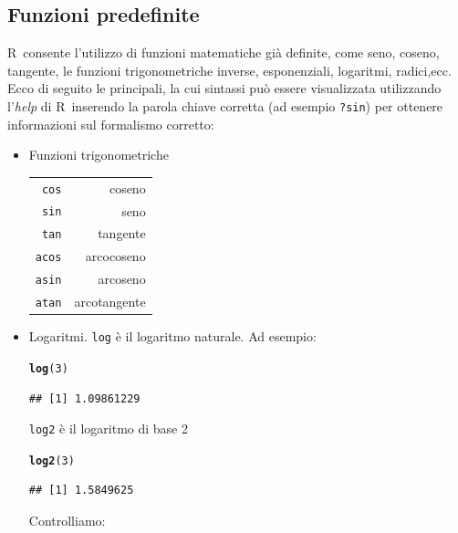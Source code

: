 \documentclass[onecolumn,11pt]{book}\usepackage[]{graphicx}\usepackage[]{color}
\makeatletter
\newcommand{\hlnum}[1]{\textcolor[rgb]{0.686,0.059,0.569}{#1}}%
\newcommand{\hlstd}[1]{\textcolor[rgb]{0.345,0.345,0.345}{#1}}%
\newcommand{\hlkwd}[1]{\textcolor[rgb]{0.737,0.353,0.396}{\textbf{#1}}}%
\newenvironment{kframe}{%
 \def\at@end@of@kframe{}%
 \ifinner\ifhmode%
  \def\at@end@of@kframe{\end{minipage}}%
  \begin{minipage}{\columnwidth}%
 \fi\fi%
 \def\FrameCommand##1{\hskip\@totalleftmargin \hskip-\fboxsep
 \colorbox{shadecolor}{##1}\hskip-\fboxsep
     \hskip-\linewidth \hskip-\@totalleftmargin \hskip\columnwidth}%
 \MakeFramed {\advance\hsize-\width
   \@totalleftmargin\z@ \linewidth\hsize
   \@setminipage}}%
 {\par\unskip\endMakeFramed%
 \at@end@of@kframe}
\newenvironment{knitrout}{}{} %
\newcommand{\rpr}{\textsf{R}~}
\makeatother
\begin{document}
\subsection{Funzioni predefinite}
\rpr consente l'utilizzo di funzioni matematiche gi\`a definite, come seno, coseno, tangente, le funzioni trigonometriche inverse, esponenziali, logaritmi, radici,ecc.
Ecco di seguito le principali, la cui sintassi pu\`o essere visualizzata utilizzando l'\emph {help} di \rpr inserendo la parola chiave corretta (ad esempio \texttt{?sin}) per ottenere informazioni sul formalismo corretto:
\begin{itemize}
 \item{}
 Funzioni trigonometriche\hfill\vskip10pt
 \begin{tabular}{|r r |}\hline
\texttt{cos}&  coseno\\
\texttt{sin}& seno\\
\texttt{tan}&   tangente\\
\texttt{acos}&   arcocoseno\\
\texttt{asin}&   arcoseno\\
\texttt{atan} &  arcotangente\\
\hline
\end{tabular}
\item{}Logaritmi.\vskip10pt
\texttt{log} \`e il  logaritmo naturale. Ad esempio:
\begin{knitrout}
\color{fgcolor}\begin{kframe}
\begin{alltt}
\hlkwd{log}\hlstd{(}\hlnum{3}\hlstd{)}
\end{alltt}
\begin{verbatim}
## [1] 1.09861229
\end{verbatim}
\end{kframe}
\end{knitrout}
\texttt{log2} \`e il logaritmo di base 2
\begin{knitrout}
\color{fgcolor}\begin{kframe}
\begin{alltt}
\hlkwd{log2}\hlstd{(}\hlnum{3}\hlstd{)}
\end{alltt}
\begin{verbatim}
## [1] 1.5849625
\end{verbatim}
\end{kframe}
\end{knitrout}
Controlliamo:
\begin{knitrout}

\end{knitrout}
\end{itemize}
\end{document}
